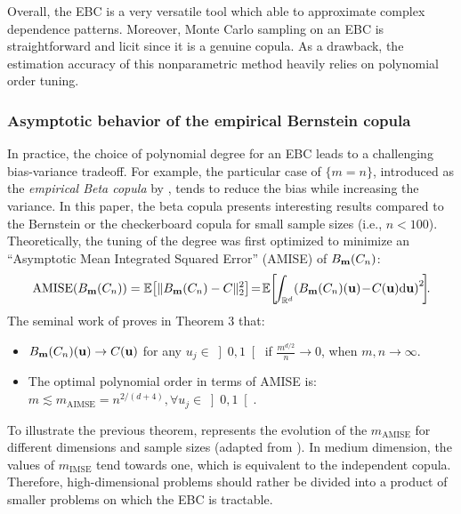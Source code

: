 Overall, the EBC is a very versatile tool which able to approximate complex dependence patterns. 
Moreover, Monte Carlo sampling on an EBC is straightforward and licit since it is a genuine copula. 
As a drawback, the estimation accuracy of this nonparametric method heavily relies on polynomial order tuning.   


\subsubsection{Asymptotic behavior of the empirical Bernstein copula}
In practice, the choice of polynomial degree for an EBC leads to a challenging bias-variance tradeoff. 
For example, the particular case of $\{m = n\}$, introduced as the \textit{empirical Beta copula} by \cite{segers_2017}, tends to reduce the bias while increasing the variance. 
In this paper, the beta copula presents interesting results compared to the Bernstein or the checkerboard copula for small sample sizes (i.e., $n<100$). 
Theoretically, the tuning of the degree was first optimized to minimize an ``Asymptotic Mean Integrated Squared Error'' (AMISE) of $B_{{\bf m}}(C_n)$: 
\begin{equation}
    \mathrm{AMISE}(B_{\bm}(C_n)) = \E\!\left[ \lVert B_{\bm}(C_n) - C \rVert^2_2 \right] \!=\! \E\!\left[\!\int_{\R^d}\! \left(B_{\bm}(C_n)(\bu) \!-\! C(\bu) \dd \bu \right)^2 \!\right]\!\!.
    \label{eq:aimse}
\end{equation}
The seminal work of \citet{sancetta_satchell_2004} proves in Theorem 3 that: 
\begin{itemize}
    \item $B_{{\bf m}}(C_n)({\bf u}) \rightarrow C({\bf u})$ for any $u_j \in \left]0, 1\right[$ if $\frac{m^{d/2}}{n} \rightarrow 0$, when $m, n \rightarrow \infty$.
    \item The optimal polynomial order in terms of AMISE is\footnotemark: $m \lesssim m_{\mathrm{AIMSE}} = n^{2/(d+4)}, \forall u_j \in \left]0, 1\right[$.    
\end{itemize}
To illustrate the previous theorem,  represents the evolution of the $m_{\mathrm{AMISE}}$ for different dimensions and sample sizes (adapted from \citealt{lasserre_2022}). 
In medium dimension, the values of $m_{\mathrm{IMSE}}$ tend towards one, which is equivalent to the independent copula. 
Therefore, high-dimensional problems should rather be divided into a product of smaller problems on which the EBC is tractable.

